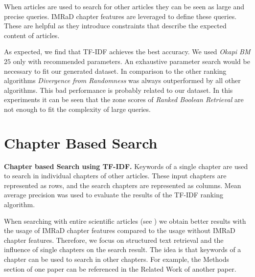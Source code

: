When articles are used to search for other articles they can be seen as large and precise queries. IMRaD chapter features are leveraged to define these queries. These are helpful as they introduce constraints that describe the expected content of articles.

As expected, we find that TF-IDF achieves the best accuracy. We used \textit{Okapi BM$25$} only with recommended parameters. An exhaustive parameter search would be necessary to fit our generated dataset. In comparison to the other ranking algorithms \textit{Divergence from Randomness} was always outperformed by all other algorithms. This bad performance is probably related to our dataset. In this experiments it can be seen that the zone scores of \textit{Ranked Boolean Retrieval} are not enough to fit the complexity of large queries. 


\section{Chapter Based Search}

\begin{table}[b!]
\vrule{}\vrule
  \caption[Chapter based Search using TF-IDF]{\textbf{Chapter based Search using TF-IDF.} Keywords of a single chapter are used to search in individual chapters of other articles. These input chapters are represented as rows, and the search chapters are represented as columns. Mean average precision was used to evaluate the results of the TF-IDF ranking algorithm.}
  \label{tbl:chapter_based_tfidf}
\end{table}

When searching with entire scientific articles (see ) we obtain better results with the usage of IMRaD chapter features compared to the usage without IMRaD chapter features. Therefore, we focus on structured text retrieval and the influence of single chapters on the search result. The idea is that keywords of a chapter can be used to search in other chapters. For example, the Methods section of one paper can be referenced in the Related Work of another paper.

